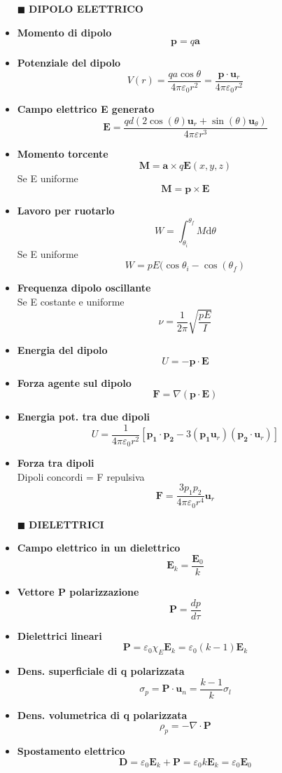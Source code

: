 \documentclass{book}
\newcommand{\g}{\textbf}
\newcommand{\h}{\mathbf}
\newcommand{\e}{\begin{equation}}
\newcommand{\ex}{\end{equation} }
\renewcommand{\it}{\item[$\cdot$]}
\begin{document}
\begin{multicols}{4}
\begin{itemize}
\item [$\blacksquare$] \g{DIPOLO ELETTRICO}
    \it \g{Momento di dipolo}
        \e{\h{p}=q \h{a}} \ex
    \it \g{Potenziale del dipolo}
        \e{V(r)=\frac{qa\cos{\theta}}{4\pi\varepsilon_0 r^2}=\frac{\h{p}\cdot\h{u}_r}{4\pi\varepsilon_0 r^2}} \ex
    \it \g{Campo elettrico \g{E} generato}
        \e{\mathbf{E}={\frac{q d\left(2\cos\left(\theta\right)\mathbf{u}_{r}+\sin\left(\theta\right)\mathbf{u}_{\theta}\right)}{4\pi\varepsilon r^{3}}}} \ex
    \it \g{Momento torcente}
        \e{\h{M}=\h{a}\times q\h{E}(x,y,z)} \ex
        Se E uniforme
        \e{\h{M}=\h{p}\times\h{E}} \ex
    \it \g{Lavoro per ruotarlo} 
        \e{W=\int_{\theta_{i}}^{\theta_{f}}M \mathrm{d}\theta} \ex
        Se E uniforme
        \e{W=p E(\cos\theta_{i}-\cos(\theta_{f})} \ex
    \it \g{Frequenza dipolo oscillante} \\
        Se E costante e uniforme
        \e{\nu=\frac{1}{2\pi}\sqrt{\frac{pE}{I}}} \ex
    \it \g{Energia del dipolo}
        \e{U=-\h{p}\cdot\h{E}} \ex
    \it \g{Forza agente sul dipolo}
        \e{\h{F}=\nabla(\h{p}\cdot\h{E})} \ex
    \it \g{Energia pot. tra due dipoli}
        \e{U=\frac{1}{4\pi\varepsilon_0r^2}[\h{p_1}\cdot\h{p_2}-3(\h{p_1}\h{u}_r)(\h{p_2}\cdot\h{u}_r)]}\ex
    \it \g{Forza tra dipoli}\\
        Dipoli concordi = F repulsiva
        \e{\h{F}=\frac{3p_1p_2}{4\pi\varepsilon_0r^4}\h{u}_r}\ex
        
\item [$\blacksquare$] \g{DIELETTRICI}
    \it \g{Campo elettrico in un dielettrico}
        \e{\h{E}_k=\frac{\h{E}_0}{k}} \ex
    \it \g{Vettore P polarizzazione}
        \e{\h{P}=\frac{dp}{d\tau}} \ex
    \it \g{Dielettrici lineari}
        \e{\h{P}=\varepsilon_0\chi_E \h{E}_k=\varepsilon_0(k-1)\h{E}_k} \ex
    \it \g{Dens. superficiale di q polarizzata}
        \e{\sigma_p=\h{P}\cdot\h{u}_n=\frac{k-1}{k}\sigma_l} \ex
    \it \g{Dens. volumetrica di q polarizzata}
        \e{\rho_p=-\nabla\cdot\h{P}} \ex
    \it \g{Spostamento elettrico}
        \e{\h{D}=\varepsilon_0 \h{E}_k+\h{P}=\varepsilon_0 k \h{E}_k=\varepsilon_0 \h{E}_0} \ex


\end{itemize}
\end{multicols}
\end{document}
